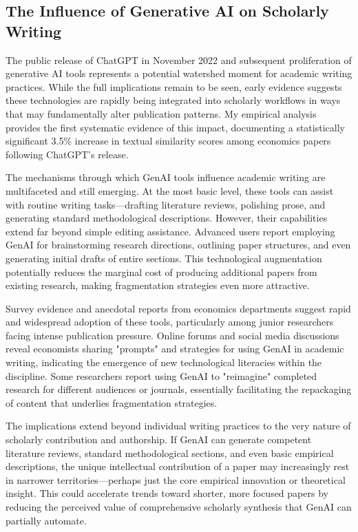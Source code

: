 \documentclass[12pt]{article}
\begin{document}
\subsection{The Influence of Generative AI on Scholarly Writing}

The public release of ChatGPT in November 2022 and subsequent proliferation of generative AI tools represents a potential watershed moment for academic writing practices. While the full implications remain to be seen, early evidence suggests these technologies are rapidly being integrated into scholarly workflows in ways that may fundamentally alter publication patterns. My empirical analysis provides the first systematic evidence of this impact, documenting a statistically significant 3.5\% increase in textual similarity scores among economics papers following ChatGPT's release.

The mechanisms through which GenAI tools influence academic writing are multifaceted and still emerging. At the most basic level, these tools can assist with routine writing tasks—drafting literature reviews, polishing prose, and generating standard methodological descriptions. However, their capabilities extend far beyond simple editing assistance. Advanced users report employing GenAI for brainstorming research directions, outlining paper structures, and even generating initial drafts of entire sections. This technological augmentation potentially reduces the marginal cost of producing additional papers from existing research, making fragmentation strategies even more attractive.

Survey evidence and anecdotal reports from economics departments suggest rapid and widespread adoption of these tools, particularly among junior researchers facing intense publication pressure. Online forums and social media discussions reveal economists sharing "prompts" and strategies for using GenAI in academic writing, indicating the emergence of new technological literacies within the discipline. Some researchers report using GenAI to "reimagine" completed research for different audiences or journals, essentially facilitating the repackaging of content that underlies fragmentation strategies.

The implications extend beyond individual writing practices to the very nature of scholarly contribution and authorship. If GenAI can generate competent literature reviews, standard methodological sections, and even basic empirical descriptions, the unique intellectual contribution of a paper may increasingly rest in narrower territories—perhaps just the core empirical innovation or theoretical insight. This could accelerate trends toward shorter, more focused papers by reducing the perceived value of comprehensive scholarly synthesis that GenAI can partially automate.
\end{document}
